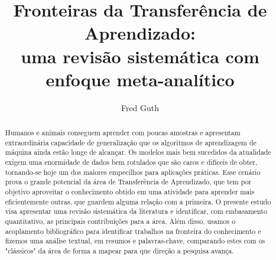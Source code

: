 \documentclass[sigconf]{acmart}
\begin{document}
%
\title[Fronteiras da Transferência de Aprendizado: uma revisão sistemática com enfoque meta-analítico]{Fronteiras da Transferência de Aprendizado: \\
uma revisão sistemática com enfoque meta-analítico}
%
\author{Fred Guth}

%
\renewcommand{\shortauthors}{Guth,.}

%
\begin{abstract}
  Humanos e animais conseguem aprender com poucas amostras \cite{goodfellow} e apresentam extraordinária capacidade de generalização que os algoritmos de aprendizagem de máquina ainda estão longe de alcançar. Os modelos mais bem sucedidos da atualidade exigem uma enormidade de dados bem rotulados que são caros e difíceis de obter, tornando-se hoje um dos maiores empecilhos para aplicações práticas. Esse cenário prova o grande potencial da área de Transferência de Aprendizado, que tem por objetivo aproveitar o conhecimento obtido em uma atividade para aprender mais eficientemente outras, que guardem alguma relação com a primeira. O presente estudo visa apresentar uma revisão sistemática da literatura e identificar, com embasamento quantitativo, as principais contribuições para a área. Além disso, usamos o acoplamento bibliográfico para identificar trabalhos na fronteira do conhecimento e fizemos uma análise textual, em resumos e palavras-chave, comparando estes com os "clássicos" da área de forma a mapear para que direção a pesquisa avança.
  
\end{abstract}
\end{document}
